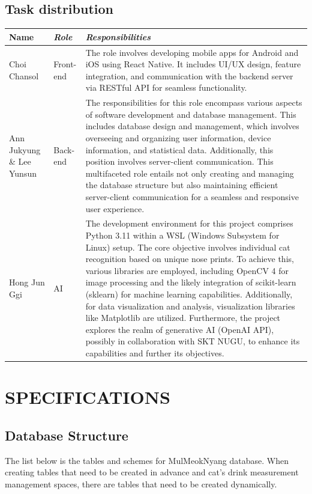 \documentclass[conference]{IEEEtran}
\begin{document}
\subsection{Task distribution}
\begin{table}[!htbp]\normalsize
\begin{center}
\begin{tabular}{|p{1.2cm}|p{1.9cm}|p{4.5cm}|}
\hline
\textbf{Name} & \textbf{\textit{Role}}& \textbf{\textit{Responsibilities}}\\
\hline
Choi Chansol & Front-end &
The role involves developing mobile apps for Android and iOS using React Native. It includes UI/UX design, feature integration, and communication with the backend server via RESTful API for seamless functionality.
\\ \hline
Ann Jukyung \& Lee Yunsun & Back-end &
The responsibilities for this role encompass various aspects of software development and database management. This includes database design and management, which involves overseeing and organizing user information, device information, and statistical data. Additionally, this position involves server-client communication. This multifaceted role entails not only creating and managing the database structure but also maintaining efficient server-client communication for a seamless and responsive user experience.
\\ \hline
Hong Jun Ggi & AI &
The development environment for this project comprises Python 3.11 within a WSL (Windows Subsystem for Linux) setup. The core objective involves individual cat recognition based on unique nose prints. To achieve this, various libraries are employed, including OpenCV 4 for image processing and the likely integration of scikit-learn (sklearn) for machine learning capabilities. Additionally, for data visualization and analysis, visualization libraries like Matplotlib are utilized. Furthermore, the project explores the realm of generative AI (OpenAI API), possibly in collaboration with SKT NUGU, to enhance its capabilities and further its objectives.
\\ \hline
\end{tabular}
\label{tab2}
\end{center}
\end{table}

\section{SPECIFICATIONS}
\subsection{Database Structure}
The list below is the tables and schemes for MulMeokNyang database. When creating tables that need to be created in advance and cat's drink measurement management spaces, there are tables that need to be created dynamically.   \\
\end{document}
